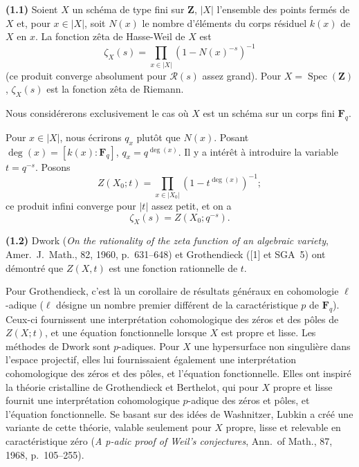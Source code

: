 \documentclass[12pt,a4paper]{amsart}
\theoremstyle{plain}
\theoremstyle{definition}
\theoremstyle{remark}
\DeclareMathOperator{\Spec}{Spec}
\newcommand{\Z}{\mathbf{Z}}
\newcommand{\F}{\mathbf{F}}
\numberwithin{equation}{section}
\begin{document}
\noindent \textbf{(1.1)} Soient $X$ un sch\'ema de type fini sur $\Z$, $|X|$ l'ensemble des points ferm\'es de $X$ et, pour $x\in|X|$, soit $N(x)$ le nombre d'\'el\'ements du corps r\'esiduel $k(x)$ de $X$ en $x$. La fonction z\^eta de Hasse-Weil de $X$ est
\begin{equation}\label{eq:1.1.1}
\zeta_X(s) = \prod_{x\in|X|} (1-N(x)^{-s})^{-1}
\end{equation}
(ce produit converge absolument pour $\mathscr{R}(s)$ assez grand). Pour $X=\Spec(\Z)$, $\zeta_X(s)$ est la fonction z\^eta de Riemann.

Nous consid\'ererons exclusivement le cas o\`u $X$ est un sch\'ema sur un corps fini $\F_q$.

Pour $x\in|X|$, nous \'ecrirons $q_x$ plut\^ot que $N(x)$. Posant $\deg(x)=[k(x):\F_q]$, $q_x = q^{\deg(x)}$. Il y a int\'er\^et \`a introduire la variable $t=q^{-s}$. Posons
\begin{equation}\label{eq:1.1.2}
Z(X_0; t) = \prod_{x\in|X_0|} (1-t^{\deg(x)})^{-1};
\end{equation}
ce produit infini converge pour $|t|$ assez petit, et on a
\begin{equation}\label{eq:1.1.3}
\zeta_X(s) = Z(X_0; q^{-s}).
\end{equation}

\noindent \textbf{(1.2)} Dwork (\textit{On the rationality of the zeta function of an algebraic variety}, Amer.\ J.\ Math., 82, 1960, p.~631--648) et Grothendieck ([1] et SGA~5) ont d\'emontr\'e que $Z(X,t)$ est une fonction rationnelle de $t$.

Pour Grothendieck, c'est l\`a un corollaire de r\'esultats g\'en\'eraux en cohomologie $\ell$-adique ($\ell$ d\'esigne un nombre premier diff\'erent de la caract\'eristique $p$ de $\F_q$). Ceux-ci fournissent une interpr\'etation cohomologique des z\'eros et des p\^oles de $Z(X;t)$, et une \'equation fonctionnelle lorsque $X$ est propre et lisse. Les m\'ethodes de Dwork sont $p$-adiques. Pour $X$ une hypersurface non singuli\`ere dans l'espace projectif, elles lui fournissaient \'egalement une interpr\'etation cohomologique des z\'eros et des p\^oles, et l'\'equation fonctionnelle. Elles ont inspir\'e la th\'eorie cristalline de Grothendieck et Berthelot, qui pour $X$ propre et lisse fournit une interpr\'etation cohomologique $p$-adique des z\'eros et p\^oles, et l'\'equation fonctionnelle. Se basant sur des id\'ees de Washnitzer, Lubkin a cr\'e\'e une variante de cette th\'eorie, valable seulement pour $X$ propre, lisse et relevable en caract\'eristique z\'ero (\textit{A p-adic proof of Weil's conjectures}, Ann.\ of Math., 87, 1968, p.~105--255).
\end{document}
